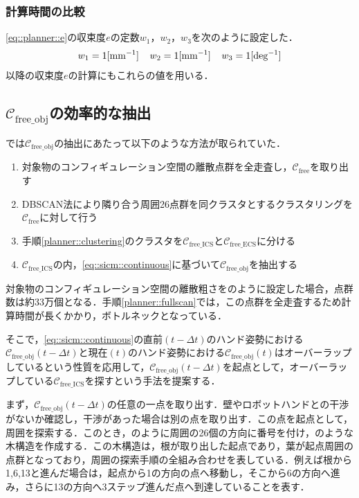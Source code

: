 \documentclass[a4paper,twoside,12pt,papersize, dvipdfmx]{iirthesis}
\begin{document}
\subsubsection{計算時間の比較}
\eqref{eq::planner::e}の収束度$e$の定数$w_1$，$w_2$，$w_3$を次のように設定した．
\begin{gather}
\notag
w_1=1 \mathrm{[mm^{-1}]} \;\;\;\; w_2=1 \mathrm{[mm^{-1}]} \;\;\;\; w_3=1 \mathrm{[deg^{-1}]}
\end{gather}
以降の収束度$e$の計算にもこれらの値を用いる．


\subsection{$\mathcal{C}_{\mathrm{free\_obj}}$の効率的な抽出}\label{subsec::planner::dfs}
\cite{komiyama2021}では$\mathcal{C}_{\mathrm{free\_obj}}$の抽出にあたって以下のような方法が取られていた．
\begin{enumerate}
\item 対象物のコンフィギュレーション空間の離散点群を全走査し，$\mathcal{C}_{\mathrm{free}}$を取り出す \label{planner::fullscan}
\item DBSCAN法\cite{}により隣り合う周囲26点群を同クラスタとするクラスタリングを$\mathcal{C}_{\mathrm{free}}$に対して行う\label{planner::clustering}
\item 手順\ref{planner::clustering}のクラスタを$\mathcal{C}_{\mathrm{free\_ICS}}$と$\mathcal{C}_{\mathrm{free\_ECS}}$に分ける
\item $\mathcal{C}_{\mathrm{free\_ICS}}$の内，\eqref{eq::sicm::continuous}に基づいて$\mathcal{C}_{\mathrm{free\_obj}}$を抽出する
\end{enumerate}
対象物のコンフィギュレーション空間の離散粗さをのように設定した場合，点群数は約33万個となる．手順\ref{planner::fullscan}では，この点群を全走査するため計算時間が長くかかり，ボトルネックとなっている．\par

そこで，\eqref{eq::sicm::continuous}の直前$(t-\Delta t)$のハンド姿勢における$\mathcal{C}_{\mathrm{free\_obj}}(t-\Delta t)$と現在$(t)$のハンド姿勢における$\mathcal{C}_{\mathrm{free\_obj}}(t)$はオーバーラップしているという性質を応用して，$\mathcal{C}_{\mathrm{free\_obj}}(t-\Delta t)$を起点として，オーバーラップしている$\mathcal{C}_{\mathrm{free\_ICS}}$を探すという手法を提案する．\par

まず，$\mathcal{C}_{\mathrm{free\_obj}}(t-\Delta t)$の任意の一点を取り出す．壁やロボットハンドとの干渉がないか確認し，干渉があった場合は別の点を取り出す．この点を起点として，周囲を探索する．このとき，\figref{}のように周囲の26個の方向に番号を付け，\figref{}のような木構造を作成する．この木構造は，根が取り出した起点であり，葉が起点周囲の点群となっており，周囲の探索手順の全組み合わせを表している．例えば根から1,6,13と進んだ場合は，起点から1の方向の点へ移動し，そこから6の方向へ進み，さらに13の方向へ3ステップ進んだ点へ到達していることを表す．\par
\end{document}
